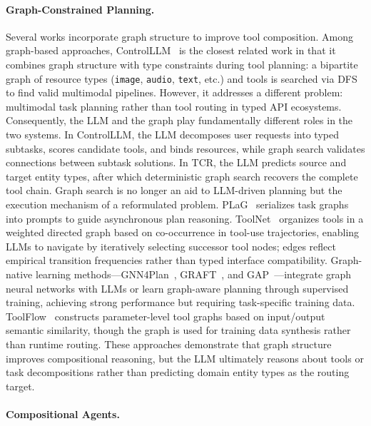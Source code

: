 \paragraph{Graph-Constrained Planning.}

Several works incorporate graph structure to improve tool composition.
Among graph-based approaches, ControlLLM~\cite{zhang2024controlllm} is the closest related work in that it combines graph structure with type constraints during tool planning: a bipartite graph of resource types (\texttt{image}, \texttt{audio}, \texttt{text}, etc.) and tools is searched via DFS to find valid multimodal pipelines.
However, it addresses a different problem: multimodal task planning rather than tool routing in typed API ecosystems.
Consequently, the LLM and the graph play fundamentally different roles in the two systems.
In ControlLLM, the LLM decomposes user requests into typed subtasks, scores candidate tools, and binds resources, while graph search validates connections between subtask solutions.
In TCR, the LLM predicts source and target entity types, after which deterministic graph search recovers the complete tool chain.
Graph search is no longer an aid to LLM-driven planning but the execution mechanism of a reformulated problem.
PLaG~\cite{lin2024plag} serializes task graphs into prompts to guide asynchronous plan reasoning.
ToolNet~\cite{liu2024toolnet} organizes tools in a weighted directed graph based on co-occurrence in tool-use trajectories, enabling LLMs to navigate by iteratively selecting successor tool nodes; edges reflect empirical transition frequencies rather than typed interface compatibility.
Graph-native learning methods---GNN4Plan~\cite{wang2024gnn4plan}, GRAFT~\cite{li2025graft}, and GAP~\cite{li2025gap}---integrate graph neural networks with LLMs or learn graph-aware planning through supervised training, achieving strong performance but requiring task-specific training data.
ToolFlow~\cite{wang2025toolflow} constructs parameter-level tool graphs based on input/output semantic similarity, though the graph is used for training data synthesis rather than runtime routing.
These approaches demonstrate that graph structure improves compositional reasoning, but the LLM ultimately reasons about tools or task decompositions rather than predicting domain entity types as the routing target.

\paragraph{Compositional Agents.}

